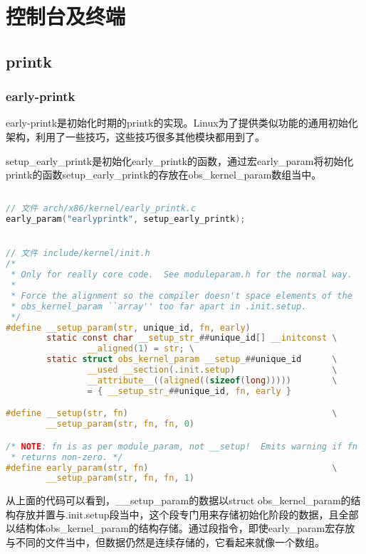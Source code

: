 \chapter{控制台及终端}

\section{printk}
\subsection{early-printk}
early-printk是初始化时期的printk的实现。Linux为了提供类似功能的通用初始化架构，利用了一些技巧，这些技巧很多其他模块都用到了。


setup\_early\_printk是初始化early\_printk的函数，通过宏early\_param将初始化printk的函数setup\_early\_printk的存放在obs\_kernel\_param数组当中。

\begin{lstlisting}[language=c]

// 文件 arch/x86/kernel/early_printk.c
early_param("earlyprintk", setup_early_printk);


// 文件 include/kernel/init.h
/*
 * Only for really core code.  See moduleparam.h for the normal way.
 *
 * Force the alignment so the compiler doesn't space elements of the
 * obs_kernel_param ``array'' too far apart in .init.setup.
 */
#define __setup_param(str, unique_id, fn, early)                        \
        static const char __setup_str_##unique_id[] __initconst \
                __aligned(1) = str; \
        static struct obs_kernel_param __setup_##unique_id      \
                __used __section(.init.setup)                   \
                __attribute__((aligned((sizeof(long)))))        \
                = { __setup_str_##unique_id, fn, early }

#define __setup(str, fn)                                        \
        __setup_param(str, fn, fn, 0)

/* NOTE: fn is as per module_param, not __setup!  Emits warning if fn
 * returns non-zero. */
#define early_param(str, fn)                                    \
        __setup_param(str, fn, fn, 1)

\end{lstlisting}
从上面的代码可以看到，\_\_setup\_param的数据以struct obs\_kernel\_param的结构存放并置与.init.setup段当中，这个段专门用来存储初始化阶段的数据，且全部以结构体obs\_kernel\_param的结构存储。通过段指令，即使early\_param宏存放与不同的文件当中，但数据仍然是连续存储的，它看起来就像一个数组。

